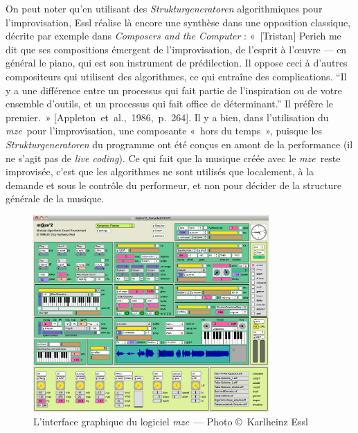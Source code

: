 \documentclass[a4paper,12pt]{article}
\newcommand{\guill}[1]{«~#1~»}
\newcommand{\guilldeux}[1]{“#1”}
\newcommand{\maze}[0]{\emph{m\symbol{64}ze\textdegree2}}
\newcommand{\cicite}[1]{{\footnotesize[#1]}}
\begin{document}
On peut noter qu'en utilisant des \emph{Strukturgeneratoren} algorithmiques pour l'improvisation, Essl réalise là encore une synthèse dans une opposition classique, décrite par exemple dans \emph{Composers and the Computer} : \guill{[Tristan] Perich me dit que ses compositions émergent de l'improvisation, de l'esprit à l'œuvre --- en général le piano, qui est son instrument de prédilection. Il oppose ceci à d'autres compositeurs qui utilisent des algorithmes, ce qui entraîne des complications. \guilldeux{Il y a une différence entre un processus qui fait partie de l'inspiration ou de votre ensemble d'outils, et un processus qui fait office de déterminant.} Il préfère le premier.} \cicite{Appleton~et~al.,~1986,~p.~264}. Il y a bien, dans l'utilisation du \maze~pour l'improvisation, une composante \guill{hors du temps}, puisque les \emph{Strukturgeneratoren} du programme ont été conçus en amont de la performance (il ne s'agit pas de \emph{live coding}). Ce qui fait que la musique créée avec le \maze~reste improvisée, c'est que les algorithmes ne sont utilisés que localement, à la demande et sous le contrôle du performeur, et non pour décider de la structure générale de la musique.

\begin{figure}[!h]
\begin{center}
\includegraphics[width=9cm]{images/maze.png}
\caption{\footnotesize L'interface graphique du logiciel \maze~--- Photo \copyright~Karlheinz Essl}
\label{mazephoto}
\end{center}
\end{figure}
\end{document}
